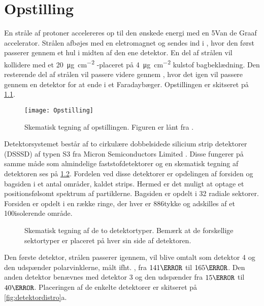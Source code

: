 \chapter{Opstilling}
\label{cha:opstilling}

En stråle af protoner accelereres op til den ønskede energi med en 5\MV Van de Graaf
accelerator. Strålen afbøjes med en eletromagnet og sendes ind i \beamline, hvor den først
passerer gennem et hul i midten af den ene detektor. En del af strålen vil kollidere med et
\SI[per-mode = symbol]{20}{\micro\gram\per\cm\squared} \Bor-\target placeret på
\SI[per-mode = symbol]{4}{\micro\gram\per\cm\squared} kulstof bagbeklædning.  Den resterende del af
strålen vil passere videre gennem \beamline, hvor det igen vil passere gennem en detektor for at
ende i et Faradaybæger. Opstillingen er skitseret på \cref{fig:opstilling}.
\begin{figure}[h]
  \centering
  \texttt{[image: Opstilling]}
  \caption{Skematisk tegning af opstillingen. Figuren er lånt fra \cite{Knudsen}.}
  \label{fig:opstilling}
\end{figure}

Detektorsystemet består af to cirkulære dobbelsidede silicium strip detektorer (DSSSD) af typen S3 fra Micron
Semiconductors Limited \cite{micron-s3}.  Disse fungerer på samme måde som almindelige
faststofdetektorer og en skematisk tegning af detektoren ses på \cref{fig:S3}.  Fordelen ved disse
detektorer er opdelingen af forsiden og bagsiden i et antal områder, kaldet strips. Hermed er det
muligt at optage et positionsfølsomt spektrum af partiklerne. Bagsiden er opdelt i 32 radiale
sektorer. Forsiden er opdelt i en række ringe, der hver er 886\um tykke og adskilles af et
100\um isolerende område.
\begin{figure}[hbt]
  \setlength{\textfloatsep}{0pt plus 1.0pt minus 2.0pt}
  \centering
  \hfill
  \caption{Skematisk tegning af de to detektortyper. Bemærk at de forskellige sektortyper er
    placeret på hver sin side af detektoren.}
  \label{fig:S3}
\end{figure}

Den første detektor, strålen passerer igennem, vil blive omtalt som detektor 4 og den udspænder
polarvinklerne, målt ifht. \beamline, fra $141\degree$ til $165\degree$. Den anden detektor benævnes
med detektor 3 og den udspænder fra $15\degree$ til $40\degree$. Placeringen af de enkelte
detektorer er skitseret på \cref{fig:detektordistro}a.

